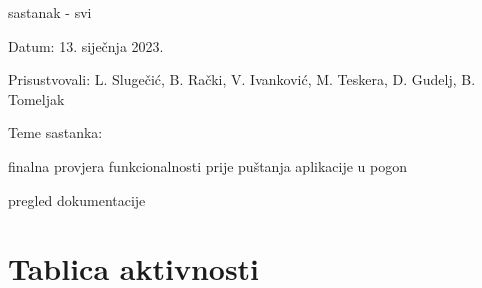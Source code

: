 \begin{packed_enum}
\begin{packed_item}
\begin{packed_item}
				
				\end{packed_item}
			\end{packed_item}
			
			\eject
			
			\item  sastanak - svi
			\item[] \begin{packed_item}
				\item Datum: 13. siječnja 2023.
				\item Prisustvovali: 
                L. Slugečić, B. Rački, V. Ivanković, M. Teskera, D. Gudelj, B. Tomeljak
				\item Teme sastanka:
				\begin{packed_item}
					\item 
                    finalna provjera funkcionalnosti prije puštanja aplikacije u pogon
                    \item
                    pregled dokumentacije
                    
				
				\end{packed_item}
			\end{packed_item}
			
			
		\end{packed_enum}
		
		\eject
		\section*{Tablica aktivnosti}
		

